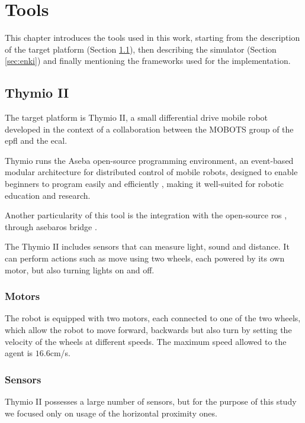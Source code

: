 \chapter{Tools}
\label{chap:impl}

This chapter introduces the tools used in this work, starting from the description 
of the target platform (Section \ref{sec:thymio}), then describing the simulator 
(Section \ref{sec:enki}) and finally mentioning the frameworks used for the 
implementation.

\section{Thymio II}
\label{sec:thymio}

The target platform is Thymio II, a small differential drive mobile robot developed 
in the context of a collaboration between the MOBOTS group of the \gls{epfl} and 
the \gls{ecal}. 

Thymio runs the Aseba open-source programming environment, an event-based 
modular architecture for distributed control of mobile robots, designed to enable 
beginners to program easily and efficiently \cite[][]{magnenat2010aseba, 
mondada2017bringing}, making it well-suited for robotic education and research.

Another particularity of this tool is the integration with the open-source 
\gls{ros} \cite[][]{quigley2009ros}, through asebaros bridge 
\cite[][]{asebaros}. 

The Thymio II includes sensors that can measure light, sound and distance. 
It can perform actions such as move using two wheels, each powered by its own 
motor, but also turning lights on and off.

\subsection{Motors}
\label{subsection:thymotors}
The robot is equipped with two motors, each connected to one of the two 
wheels, which allow the robot to move forward, backwards but also turn by 
setting the velocity of the wheels at different speeds. The maximum speed 
allowed 
to the agent is $16.6$\gls{cm/s}.

\subsection{Sensors}
\label{subsec:thysensors}

Thymio II possesses a large number of sensors, but for the purpose of this 
study we focused only on usage of the horizontal proximity ones. 

